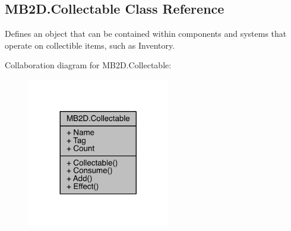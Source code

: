 \hypertarget{class_m_b2_d_1_1_collectable}{}\subsection{M\+B2\+D.\+Collectable Class Reference}
\label{class_m_b2_d_1_1_collectable}


Defines an object that can be contained within components and systems that operate on collectible items, such as Inventory.  




Collaboration diagram for M\+B2\+D.\+Collectable\+:
\nopagebreak
\begin{figure}[H]
\begin{center}
\leavevmode
\includegraphics[width=176pt]{class_m_b2_d_1_1_collectable__coll__graph}
\end{center}
\end{figure}
